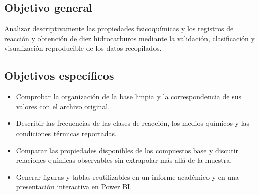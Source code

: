 \subsection{Objetivo general}
Analizar descriptivamente las propiedades fisicoquímicas y los registros de reacción y obtención de diez hidrocarburos mediante la validación, clasificación y visualización reproducible de los datos recopilados.

\subsection{Objetivos específicos}
\begin{itemize}
\item Comprobar la organización de la base limpia y la correspondencia de sus valores con el archivo original.
\item Describir las frecuencias de las clases de reacción, los medios químicos y las condiciones térmicas reportadas.
\item Comparar las propiedades disponibles de los compuestos base y discutir relaciones químicas observables sin extrapolar más allá de la muestra.
\item Generar figuras y tablas reutilizables en un informe académico y en una presentación interactiva en Power BI.
\end{itemize}
